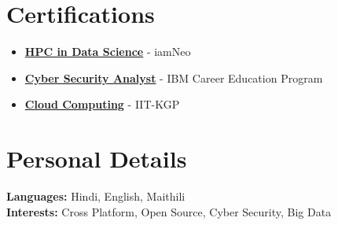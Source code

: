\documentclass[a4paper,10pt]{article}
\begin{document}
\vspace{-4pt}
\section{Certifications}
  \begin{itemize}
    \item \href{https://vit162.examly.io/certificate/U2FsdGVkX1%2FGbYKjS9DZ8Xo8HPc6ePhKpo1V9zRP3RI%3D}{\textbf{HPC in Data Science}} - iamNeo 
    \item \href{https://courses.ibmcep.cognitiveclass.ai/certificates/c193fe199bc94fb79aa6c794c9fa4cbe}{\textbf{Cyber Security Analyst}} - IBM Career Education Program 
    \item \href{https://archive.nptel.ac.in/content/noc/NOC24/SEM1/Ecertificates/106/noc24-cs17/Course/NPTEL24CS17S35290010730645933.pdf}{\textbf{Cloud Computing}} - IIT-KGP
\end{itemize}


\section{Personal Details}
\vspace{-4pt}
\hspace{1.5em}
\begin{flushleft}
  \textbf{Languages:} Hindi, English, Maithili \\[6pt]
  \textbf{Interests:} Cross Platform, Open Source, Cyber Security, Big Data
\end{flushleft}
\end{document}
